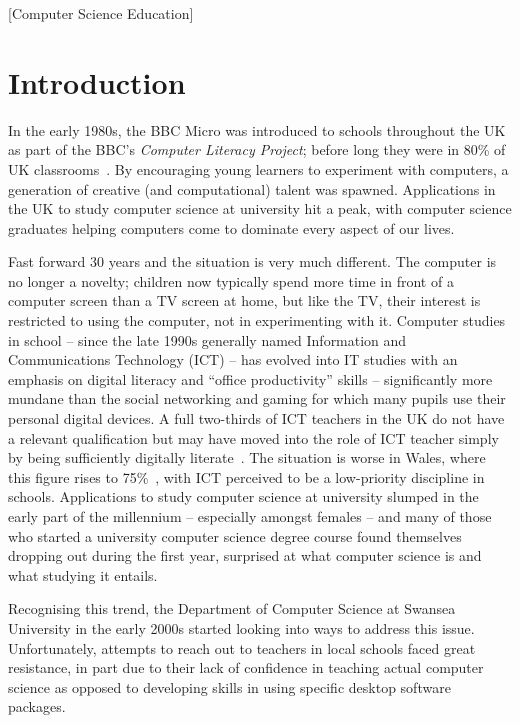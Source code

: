 \documentclass{sig-alternate}
\begin{document}
[Computer Science Education]


\section{Introduction}\label{intro}

In the early 1980s, the BBC Micro was introduced to schools throughout
the UK as part of the BBC's \emph{Computer Literacy Project}; before
long they were in 80\% of UK classrooms~\cite{vasko:1986}. By
encouraging young learners to experiment with computers, a generation
of creative (and computational) talent was spawned. Applications in
the UK to study computer science at university hit a peak, with
computer science graduates helping computers come to dominate every
aspect of our lives.

Fast forward 30 years and the situation is very much different. The
computer is no longer a novelty; children now typically spend more
time in front of a computer screen than a TV screen at home, but like
the TV, their interest is restricted to using the computer, not in
experimenting with it. Computer studies in school -- since the late
1990s generally named Information and Communications Technology (ICT)
-- has evolved into IT studies with an emphasis on digital literacy
and ``office productivity'' skills -- significantly more mundane than
the social networking and gaming for which many pupils use their
personal digital devices. A full two-thirds of ICT teachers in the UK
do not have a relevant qualification but may have moved into the role
of ICT teacher simply by being sufficiently digitally
literate~\cite{RoyalSoc:2012}.  The situation is worse in Wales, where
this figure rises to 75\%~\cite{GTCW:2008}, with ICT perceived to be a
low-priority discipline in schools. Applications to study computer
science at university slumped in the early part of the millennium --
especially amongst females -- and many of those who started a
university computer science degree course found themselves dropping
out during the first year, surprised at what computer science is and
what studying it entails.

Recognising this trend, the Department of Computer Science at Swansea
University in the early 2000s started looking into ways to address
this issue.  Unfortunately, attempts to reach out to teachers in local
schools faced great resistance, in part due to their lack of
confidence in teaching actual computer science as opposed to
developing skills in using specific desktop software packages.
\end{document}
